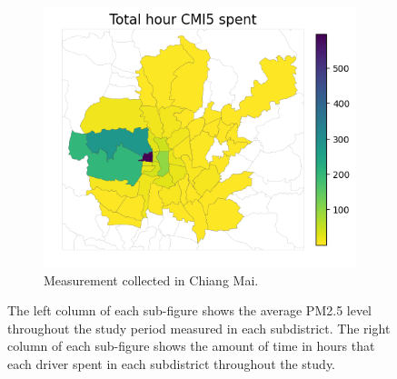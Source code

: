 \begin{figure}
\begin{subfigure}[t]{0.49\textwidth}
        \includegraphics[width=.49\linewidth]{figures/map/CMI5_time.png}
        \caption{Measurement collected in Chiang Mai.}
    \end{subfigure}%
    \caption{
    The left column of each sub-figure shows the average PM2.5 level throughout the study period measured in each subdistrict.
    The right column of each sub-figure shows the amount of time in hours that each driver spent in each subdistrict throughout the study.
    }%
    \Description{}
    \label{fig:subdistrict-aqi}%
\end{figure}%
